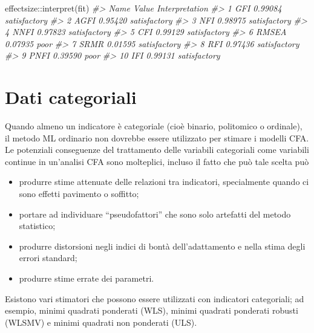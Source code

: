 \documentclass[
  11pt,
]{krantz}
\makeatletter
\newenvironment{Shaded}{\begin{snugshade}}{\end{snugshade}}
\newcommand{\CommentTok}[1]{\textcolor[rgb]{0.37,0.37,0.37}{\textit{#1}}}
\newcommand{\FunctionTok}[1]{\textcolor[rgb]{0,0,0}{#1}}
\newcommand{\NormalTok}[1]{#1}
\newcommand{\SpecialCharTok}[1]{\textcolor[rgb]{0,0,0}{#1}}
\providecommand{\tightlist}{%
  \setlength{\itemsep}{0pt}\setlength{\parskip}{0pt}}
\newenvironment{kframe}{%
\medskip{}
\setlength{\fboxsep}{.8em}
 \def\at@end@of@kframe{}%
 \ifinner\ifhmode%
  \def\at@end@of@kframe{\end{minipage}}%
  \begin{minipage}{\columnwidth}%
 \fi\fi%
 \def\FrameCommand##1{\hskip\@totalleftmargin \hskip-\fboxsep
 \colorbox{shadecolor}{##1}\hskip-\fboxsep
     \hskip-\linewidth \hskip-\@totalleftmargin \hskip\columnwidth}%
 \MakeFramed {\advance\hsize-\width
   \@totalleftmargin\z@ \linewidth\hsize
   \@setminipage}}%
 {\par\unskip\endMakeFramed%
 \at@end@of@kframe}
\renewenvironment{Shaded}{\begin{kframe}}{\end{kframe}}
\theoremstyle{definition}
\theoremstyle{definition}
\theoremstyle{definition}
\theoremstyle{definition}
\theoremstyle{remark}
\makeatother
\begin{document}
\begin{Shaded}
\begin{Highlighting}[]
\NormalTok{effectsize}\SpecialCharTok{::}\FunctionTok{interpret}\NormalTok{(fit)}
\CommentTok{\#\textgreater{}     Name   Value Interpretation}
\CommentTok{\#\textgreater{} 1    GFI 0.99084   satisfactory}
\CommentTok{\#\textgreater{} 2   AGFI 0.95420   satisfactory}
\CommentTok{\#\textgreater{} 3    NFI 0.98975   satisfactory}
\CommentTok{\#\textgreater{} 4   NNFI 0.97823   satisfactory}
\CommentTok{\#\textgreater{} 5    CFI 0.99129   satisfactory}
\CommentTok{\#\textgreater{} 6  RMSEA 0.07935           poor}
\CommentTok{\#\textgreater{} 7   SRMR 0.01595   satisfactory}
\CommentTok{\#\textgreater{} 8    RFI 0.97436   satisfactory}
\CommentTok{\#\textgreater{} 9   PNFI 0.39590           poor}
\CommentTok{\#\textgreater{} 10   IFI 0.99131   satisfactory}
\end{Highlighting}
\end{Shaded}

\hypertarget{dati-categoriali}{%
\section{Dati categoriali}\label{dati-categoriali}}

Quando almeno un indicatore è categoriale (cioè binario, politomico o ordinale), il metodo ML ordinario non dovrebbe essere utilizzato per stimare i modelli CFA. Le potenziali conseguenze del trattamento delle variabili categoriali come variabili continue in un'analisi CFA sono molteplici, incluso il fatto che può tale scelta può

\begin{itemize}
\tightlist
\item
  produrre stime attenuate delle relazioni tra indicatori, specialmente quando ci sono effetti pavimento o soffitto;
\item
  portare ad individuare ``pseudofattori'' che sono solo artefatti del metodo statistico;\\
\item
  produrre distorsioni negli indici di bontà dell'adattamento e nella stima degli errori standard;
\item
  produrre stime errate dei parametri.
\end{itemize}

Esistono vari stimatori che possono essere utilizzati con indicatori categoriali; ad esempio, minimi quadrati ponderati (WLS), minimi quadrati ponderati robusti (WLSMV) e minimi quadrati non ponderati (ULS).
\end{document}
